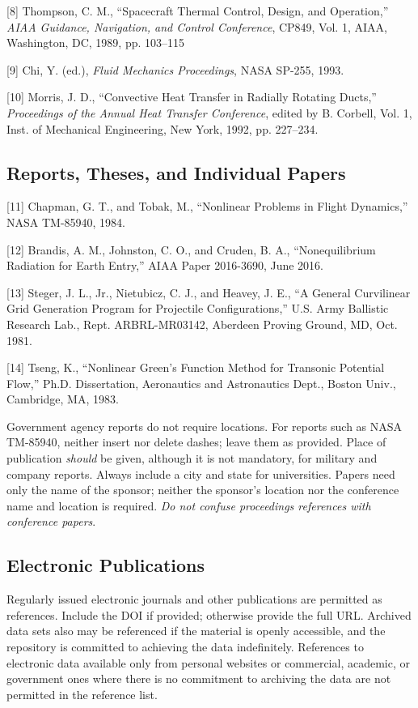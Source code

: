 \documentclass[
]{article}
\begin{document}
{[}8{]} Thompson, C. M., ``Spacecraft Thermal Control, Design, and
Operation,'' \emph{AIAA Guidance, Navigation, and Control Conference},
CP849, Vol. 1, AIAA, Washington, DC, 1989, pp. 103--115

{[}9{]} Chi, Y. (ed.), \emph{Fluid Mechanics Proceedings}, NASA SP-255,
1993.

{[}10{]} Morris, J. D., ``Convective Heat Transfer in Radially Rotating
Ducts,'' \emph{Proceedings of the Annual Heat Transfer Conference},
edited by B. Corbell, Vol. 1, Inst. of Mechanical Engineering, New York,
1992, pp. 227--234.

\subsection{Reports, Theses, and Individual
Papers}\label{reports-theses-and-individual-papers}

{[}11{]} Chapman, G. T., and Tobak, M., ``Nonlinear Problems in Flight
Dynamics,'' NASA TM-85940, 1984.

{[}12{]} Brandis, A. M., Johnston, C. O., and Cruden, B. A.,
``Nonequilibrium Radiation for Earth Entry,'' AIAA Paper 2016-3690, June
2016.

{[}13{]} Steger, J. L., Jr., Nietubicz, C. J., and Heavey, J. E., ``A
General Curvilinear Grid Generation Program for Projectile
Configurations,'' U.S. Army Ballistic Research Lab., Rept.
ARBRL-MR03142, Aberdeen Proving Ground, MD, Oct. 1981.

{[}14{]} Tseng, K., ``Nonlinear Green's Function Method for Transonic
Potential Flow,'' Ph.D. Dissertation, Aeronautics and Astronautics
Dept., Boston Univ., Cambridge, MA, 1983.

Government agency reports do not require locations. For reports such as
NASA TM-85940, neither insert nor delete dashes; leave them as provided.
Place of publication \emph{should} be given, although it is not
mandatory, for military and company reports. Always include a city and
state for universities. Papers need only the name of the sponsor;
neither the sponsor's location nor the conference name and location is
required. \emph{Do not confuse proceedings references with conference
papers}.

\subsection{Electronic Publications}\label{electronic-publications}

Regularly issued electronic journals and other publications are
permitted as references. Include the DOI if provided; otherwise provide
the full URL. Archived data sets also may be referenced if the material
is openly accessible, and the repository is committed to achieving the
data indefinitely. References to electronic data available only from
personal websites or commercial, academic, or government ones where
there is no commitment to archiving the data are not permitted in the
reference list.
\end{document}
